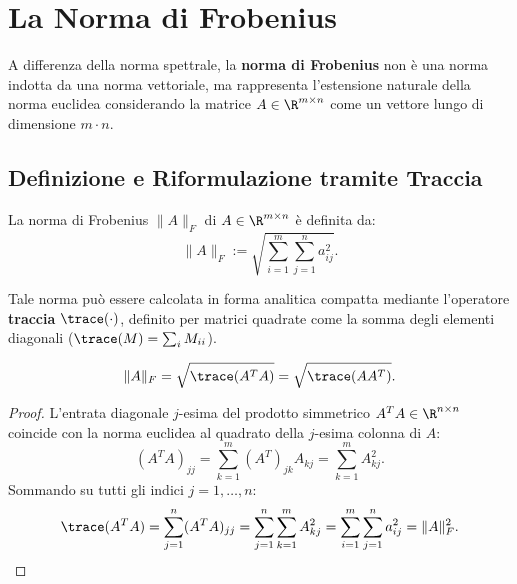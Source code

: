 \FloatBarrier
\section{La Norma di Frobenius}
\label{sec:norma-frobenius}

A differenza della norma spettrale, la \textbf{norma di Frobenius} non \`e una norma indotta da una norma vettoriale, ma rappresenta l'estensione naturale della norma euclidea considerando la matrice $A \in \R^{m \times n}$ come un vettore lungo di dimensione $m \cdot n$.

\subsection{Definizione e Riformulazione tramite Traccia}

\begin{definition}
La norma di Frobenius $\|A\|_F$ di $A \in \R^{m \times n}$ \`e definita da:
\begin{equation}
    \|A\|_F := \sqrt{\sum_{i=1}^m \sum_{j=1}^n a_{ij}^2}.
\end{equation}
\end{definition}

Tale norma pu\`o essere calcolata in forma analitica compatta mediante l'operatore \textbf{traccia} $\trace(\cdot)$, definito per matrici quadrate come la somma degli elementi diagonali ($\trace(M) = \sum_i M_{ii}$).

\begin{proposition}
\begin{equation}
    \|A\|_F = \sqrt{\trace(A^T A)} = \sqrt{\trace(A A^T)}.
\end{equation}
\end{proposition}

\begin{proof}
L'entrata diagonale $j$-esima del prodotto simmetrico $A^T A \in \R^{n \times n}$ coincide con la norma euclidea al quadrato della $j$-esima colonna di $A$:
\begin{equation}
    (A^T A)_{jj} = \sum_{k=1}^m (A^T)_{jk} A_{kj} = \sum_{k=1}^m A_{kj}^2.
\end{equation}
Sommando su tutti gli indici $j=1, \dots, n$:
\begin{equation}
    \trace(A^T A) = \sum_{j=1}^n (A^T A)_{jj} = \sum_{j=1}^n \sum_{k=1}^m A_{kj}^2 = \sum_{i=1}^m \sum_{j=1}^n a_{ij}^2 = \|A\|_F^2.
\end{equation}
\end{proof}

